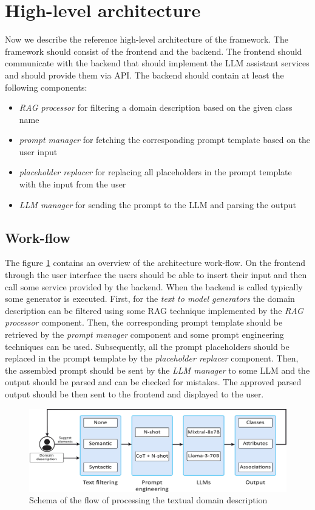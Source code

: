 \section{High-level architecture}
\label{sec:high_level_architecture}

Now we describe the reference high-level architecture of the framework. The framework should consist of the frontend and the backend. The frontend should communicate with the backend that should implement the LLM assistant services and should provide them via API. The backend should contain at least the following components:

\begin{itemize}
\item \emph{RAG processor} for filtering a domain description based on the given class name
\item \emph{prompt manager} for fetching the corresponding prompt template based on the user input
\item \emph{placeholder replacer} for replacing all placeholders in the prompt template with the input from the user
\item \emph{LLM manager} for sending the prompt to the LLM and parsing the output
\end{itemize}


\subsection{Work-flow}

The figure \ref{fig:work-flow} contains an overview of the architecture work-flow. On the frontend through the user interface the users should be able to insert their input and then call some service provided by the backend. When the backend is called typically some generator is executed. First, for the \emph{text to model generators} the domain description can be filtered using some RAG technique implemented by the \emph{RAG processor} component. Then, the corresponding prompt template should be retrieved by the \emph{prompt manager} component and some prompt engineering techniques can be used. Subsequently, all the prompt placeholders should be replaced in the prompt template by the \emph{placeholder replacer} component. Then, the assembled prompt should be sent by the \emph{LLM manager} to some LLM and the output should be parsed and can be checked for mistakes. The approved parsed output should be then sent to the frontend and displayed to the user.

\begin{figure}[!h]
    \centering
    \includegraphics[scale=0.23]{img/work-flow.jpg}
    \caption{\centering Schema of the flow of processing the textual domain description}
    \label{fig:work-flow}
\end{figure}
